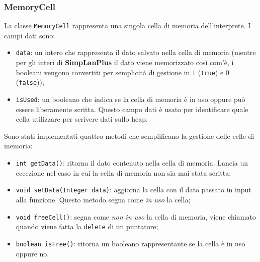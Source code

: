 \documentclass[../report.tex]{subfiles}
\begin{document}
\subsubsection{MemoryCell}\label{sss:memorycell}
La classe \verb|MemoryCell| rappresenta una singola cella di memoria dell'interprete. I campi dati sono: 
\begin{itemize}
    \item \verb|data|: un intero che rappresenta il dato salvato nella cella di memoria (mentre per gli interi di \textbf{SimpLanPlus} il dato viene memorizzato così com'è, i booleani vengono convertiti per semplicità di gestione in $1$ (\verb|true|) e $0$ (\verb|false|));
    \item \verb|isUsed|: un booleano che indica se la cella di memoria è in uso oppure può essere liberamente scritta. Questo campo dati è usato per identificare quale cella utilizzare per scrivere dati sullo heap.
\end{itemize}
Sono stati implementati quattro metodi che semplificano la gestione delle celle di memoria:
\begin{itemize}
    \item \verb|int getData()|: ritorna il dato contenuto nella cella di memoria. Lancia un eccezione nel caso in cui la cella di memoria non sia mai stata scritta;
    \item \verb|void setData(Integer data)|: aggiorna la cella con il dato passato in input alla funzione. Questo metodo segna come \textit{in uso} la cella; 
    \item \verb|void freeCell()|: segna come \textit{non in uso} la cella di memoria, viene chiamato quando viene fatta la \verb|delete| di un puntatore;
    \item \verb|boolean isFree()|: ritorna un booleano rappresentante se la cella è in uso oppure no.
\end{itemize}
\end{document}
